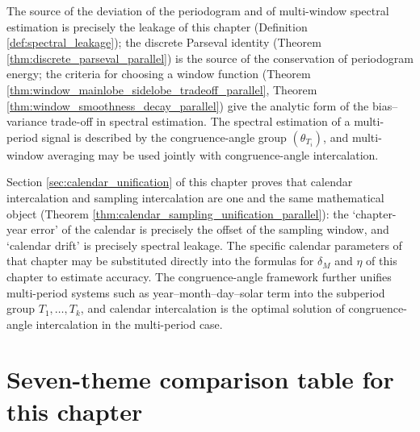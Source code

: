 \begin{remark}\label{rem:interface_time_series_parallel}
The source of the deviation of the periodogram and of multi-window spectral estimation is precisely the leakage of this chapter (Definition \ref{def:spectral_leakage}); the discrete Parseval identity (Theorem \ref{thm:discrete_parseval_parallel}) is the source of the conservation of periodogram energy; the criteria for choosing a window function (Theorem \ref{thm:window_mainlobe_sidelobe_tradeoff_parallel}, Theorem \ref{thm:window_smoothness_decay_parallel}) give the analytic form of the bias--variance trade-off in spectral estimation. The spectral estimation of a multi-period signal is described by the congruence-angle group $(\theta_{T_i})$, and multi-window averaging may be used jointly with congruence-angle intercalation.
\end{remark}

\begin{remark}\label{rem:interface_calendar_parallel}
Section \ref{sec:calendar_unification} of this chapter proves that calendar intercalation and sampling intercalation are one and the same mathematical object (Theorem \ref{thm:calendar_sampling_unification_parallel}): the `chapter-year error' of the calendar is precisely the offset of the sampling window, and `calendar drift' is precisely spectral leakage. The specific calendar parameters of that chapter may be substituted directly into the formulas for $\delta_M$ and $\eta$ of this chapter to estimate accuracy. The congruence-angle framework further unifies multi-period systems such as year--month--day--solar term into the subperiod group $T_1,\dots,T_k$, and calendar intercalation is the optimal solution of congruence-angle intercalation in the multi-period case.
\end{remark}

\section*{Seven-theme comparison table for this chapter}

